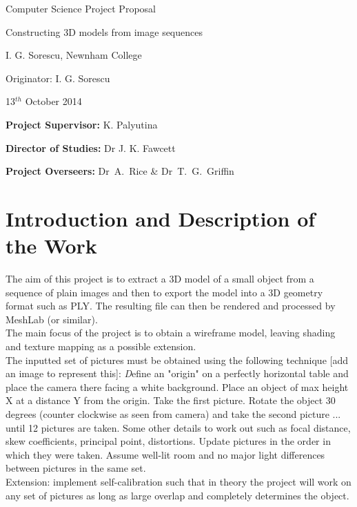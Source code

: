 

\vfil

\centerline{\Large Computer Science Project Proposal}
\vspace{0.4in}
\centerline{\Large Constructing 3D models from image sequences}
\vspace{0.4in}
\centerline{\large I. G. Sorescu, Newnham College}
\vspace{0.3in}
\centerline{\large Originator: I. G. Sorescu}
\vspace{0.3in}
\centerline{\large 13$^{th}$ October 2014}

\vfil


\noindent
{\bf Project Supervisor:} K. Palyutina
\vspace{0.2in}

\noindent
{\bf Director of Studies:} Dr J. K. Fawcett
\vspace{0.2in}
\noindent
 
\noindent
{\bf Project Overseers:} Dr~A.~Rice  \& Dr~T.~G.~Griffin



\section*{Introduction and Description of the Work}

The aim of this project is to extract a 3D model of a small object from a sequence of plain images and then to export the model into a 3D geometry format such as PLY. The resulting file can then be rendered and processed by MeshLab (or similar).  \\
The main focus of the project is to obtain a wireframe model, leaving shading and texture mapping as a possible extension. \\
The inputted set of pictures must be obtained using the following technique [add an image to represent this]: 
{\emph Define an "origin" on a perfectly horizontal table and place the camera there facing a white background. Place an object of max height X at a distance Y from the origin. Take the first picture. Rotate the object 30 degrees (counter clockwise as seen from camera) and take the second picture ... until 12 pictures are taken. Some other details to work out such as focal distance, skew coefficients, principal point, distortions. Update pictures in the order in which they were taken. Assume well-lit room and no major light differences between pictures in the same set.} \\
Extension: implement self-calibration such that in theory the project will work on any set of pictures as long as large overlap and completely determines the object.

